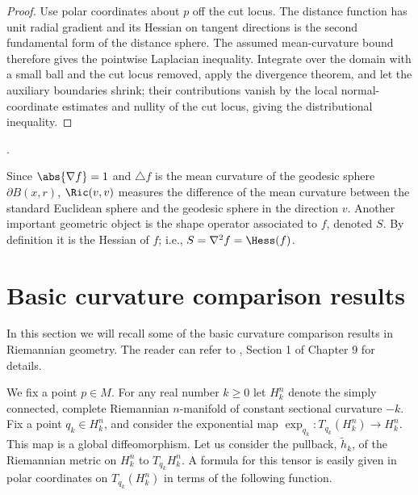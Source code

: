 \begin{proof}
\sketch

Use polar coordinates about $p$ off the cut locus. The distance function has unit radial gradient and its Hessian on tangent directions is the second fundamental form of the distance sphere. The assumed mean-curvature bound therefore gives the pointwise Laplacian inequality. Integrate over the domain with a small ball and the cut locus removed, apply the divergence theorem, and let the auxiliary boundaries shrink; their contributions vanish by the local normal-coordinate estimates and nullity of the cut locus, giving the distributional inequality.
\end{proof}
.

\medskip

Since $\abs{\nabla f} = 1$ and $\triangle f$ is the mean curvature
of the geodesic sphere $\partial B(x,r)$, $\Ric(v,v)$ measures
the difference of the mean curvature between the standard Euclidean
sphere and the geodesic sphere in the direction $v$. Another
important geometric object  is the shape operator associated to $f$,
denoted $S$. By definition it is the Hessian of $f$; i.e.,
$S=\nabla^2f=\Hess(f)$.

\section{Basic curvature comparison results}
In this section we will recall some of the basic curvature
comparison results in Riemannian geometry. The reader can refer to
\cite{Petersen}, Section 1 of Chapter 9 for details.

\smallskip

We fix a point $p\in M$. For any real number $k\ge 0$ let $H^n_k$ denote the
simply connected, complete Riemannian $n$-manifold of constant sectional
curvature $-k$. Fix a point $q_k\in H^n_k$, and consider the exponential map
$\exp_{q_k}\colon T_{q_k}(H^n_k)\to H^n_k$. This map is a global
diffeomorphism. Let us consider the pullback, $\tilde h_k$, of the Riemannian
metric on $H^n_k$ to $T_{q_k}H^n_k$. A formula for this tensor is easily given
in polar coordinates on $T_{q_k}(H^n_k)$ in terms of the following function.

